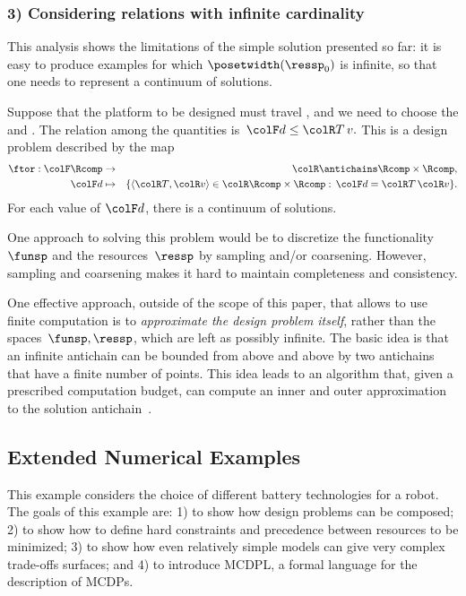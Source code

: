 \subsubsection{3) Considering relations with infinite cardinality}

This analysis shows the limitations of the simple solution presented
so far: it is easy to produce examples for which $\posetwidth(\ressp_{0})$
is infinite, so that one needs to represent a continuum of solutions.

\begin{example}
Suppose that the platform to be designed must travel , and we need to choose the 
and . The relation among the quantities
is~${\colF d}\leq{\colR T\,v}.$ This is a design problem described
by the map
\begin{eqnarray*}
\ftor:{\colF\Rcomp} & \rightarrow & {\colR\antichains\Rcomp\times\Rcomp,}\\
{\colF d} & \mapsto & \{\langle{\colR T},{\colR v}\rangle\in{\colR\Rcomp\times\Rcomp}:\,{\colF d}={\colR T}\,{\colR v}\}.
\end{eqnarray*}
For each value of ${\colF d}$, there is a continuum of solutions.
\end{example}
One approach to solving this problem would be to discretize the functionality~$\funsp$
and the resources~$\ressp$ by sampling and/or coarsening. However,
sampling and coarsening makes it hard to maintain completeness and
consistency.

One effective approach, outside of the scope of this paper, that allows
to use finite computation is to \emph{approximate the design problem}
\emph{itself}, rather than the spaces~$\funsp,\ressp$, which are
left as possibly infinite. The basic idea is that an infinite antichain
can be bounded from above and above by two antichains that have a
finite number of points. This idea leads to an algorithm that, given
a prescribed computation budget, can compute an inner and outer approximation
to the solution antichain~\cite{mcdp_icra_uncertainty_arxiv}.



\subsection{Extended Numerical Examples\label{sec:Numerical-examples}}

This example considers the choice of different battery technologies
for a robot. The goals of this example are: 1) to show how design
problems can be composed; 2) to show how to define hard constraints
and precedence between resources to be minimized; 3) to show how even
relatively simple models can give very complex trade-offs surfaces;
and 4) to introduce MCDPL, a formal language for the description of
MCDPs.

